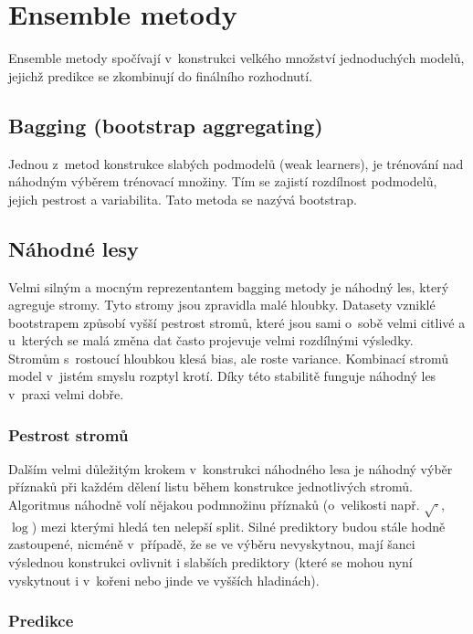 \section{Ensemble metody}

Ensemble metody spočívají v~konstrukci velkého množství jednoduchých modelů, jejichž predikce se zkombinují do finálního rozhodnutí.

\subsection{Bagging (bootstrap aggregating)}

Jednou z~metod konstrukce slabých podmodelů (weak learners), je trénování nad náhodným výběrem trénovací množiny. Tím se zajistí rozdílnost podmodelů, jejich pestrost a variabilita. Tato metoda se nazývá bootstrap.

\subsection{Náhodné lesy}

Velmi silným a mocným reprezentantem bagging metody je náhodný les, který agreguje stromy. Tyto stromy jsou zpravidla malé hloubky. Datasety vzniklé bootstrapem způsobí vyšší pestrost stromů, které jsou sami o~sobě velmi citlivé a u~kterých se malá změna dat často projevuje velmi rozdílnými výsledky. Stromům s~rostoucí hloubkou klesá bias, ale roste variance. Kombinací stromů model v~jistém smyslu rozptyl krotí. Díky této stabilitě funguje náhodný les v~praxi velmi dobře.

\subsubsection{Pestrost stromů}

Dalším velmi důležitým krokem v~konstrukci náhodného lesa je náhodný výběr příznaků při každém dělení listu během konstrukce jednotlivých stromů. Algoritmus náhodně volí nějakou podmnožinu příznaků (o~velikosti např. $\sqrt{\cdotp}$, $\log$) mezi kterými hledá ten nelepší split. Silné prediktory budou  stále hodně zastoupené, nicméně v~případě, že se ve výběru nevyskytnou, mají šanci výslednou konstrukci ovlivnit i slabších prediktory (které se mohou nyní vyskytnout i v~kořeni nebo jinde ve vyšších hladinách).

\subsubsection{Predikce}

